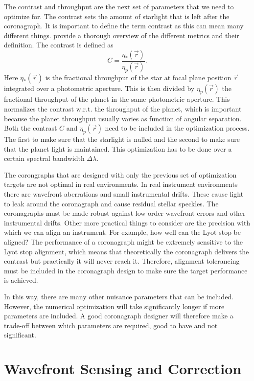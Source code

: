 \documentclass[letterpaper]{ar-1col}
\begin{document}
The contrast and throughput are the next set of parameters that we need to optimize for.
%
The contrast sets the amount of starlight that is left after the coronagraph. It is important to define the term contrast as this can mean many different things.
%
\citet{ruane2018review} provide a thorough overview of the different metrics and their definition.
%
The contrast is defined as
\begin{equation}
C = \frac{\eta_*(\vec{r})}{\eta_p(\vec{r})}.
\end{equation}
Here $\eta_*(\vec{r})$ is the fractional throughput of the star at focal plane position $\vec{r}$ integrated over a photometric aperture.
%
This is then divided by $\eta_p(\vec{r})$ the fractional throughput of the planet in the same photometric aperture.
%
This normalizes the contrast w.r.t. the throughput of the planet, which is important because the planet throughput usually varies as function of angular separation. %
%
Both the contrast $C$ and $\eta_p(\vec{r})$ need to be included in the optimization process.
%
The first to make sure that the starlight is nulled and the second to make sure that the planet light is maintained.
%
This optimization has to be done over a certain spectral bandwidth $\Delta \lambda$.

The corongraphs that are designed with only the previous set of optimization targets are not optimal in real environments.
%
In real instrument environments there are wavefront aberrations and small instrumental drifts.
%
These cause light to leak around the coronagraph and cause residual stellar speckles.
%
The coronagraphs must be made robust against low-order wavefront errors and other instrumental drifts.
%
Other more practical things to consider are the precision with which we can align an instrument. %
%
For example, how well can the Lyot stop be aligned?
%
The performance of a coronagraph might be extremely sensitive to the Lyot stop alignment, which means that theoretically the coronagraph delivers the contrast but practically it will never reach it.
%
Therefore, alignment tolerancing must be included in the coronagraph design to make sure the target performance is achieved.

In this way, there are many other nuisance parameters that can be included.
%
However, the numerical optimization will take significantly longer if more parameters are included.
%
A good coronagraph designer will therefore make a trade-off between which parameters are required, good to have and not significant.

\section{Wavefront Sensing and Correction}
\end{document}
